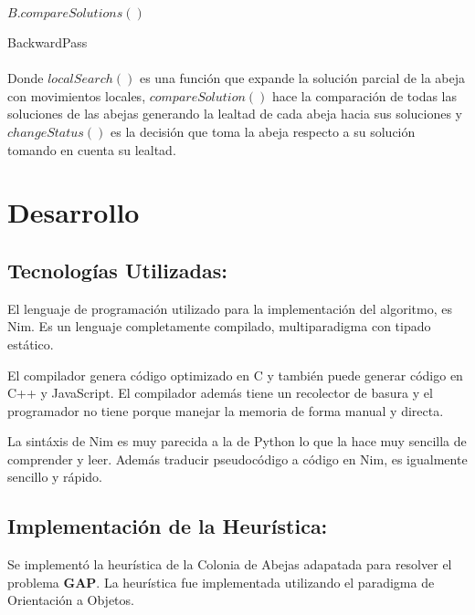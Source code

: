 \documentclass[12pt]{article}
\begin{document}
  	\begin{algorithm}[H]
  		\SetAlgoLined
  		$B.compareSolutions()$\\
  		\caption{BackwardPass}
  	\end{algorithm}
  		
  	\paragraph{}
  	Donde $localSearch()$ es una función que expande la solución parcial de la abeja
  	con movimientos locales, $compareSolution()$ hace la comparación de todas las 
  	soluciones de las abejas generando la lealtad de cada abeja hacia sus soluciones
  	y $changeStatus()$ es la decisión que toma la abeja respecto a su solución 
  	tomando en cuenta su lealtad.
  	
  	
	\section{Desarrollo}
	
	\subsection{Tecnologías Utilizadas:}
	
	El lenguaje de programación utilizado para la implementación del algoritmo, es Nim.
	Es un lenguaje completamente compilado, multiparadigma con tipado estático. 
	
	El compilador genera código optimizado en C y también puede generar código en C++ y
	JavaScript.
	El compilador además tiene un recolector de basura y el programador no tiene porque
	manejar la memoria de forma manual y directa.
	
	La sintáxis de Nim es muy parecida a la de Python lo que la hace muy sencilla de
	comprender y leer. Además traducir pseudocódigo a código en Nim, es igualmente
	sencillo y rápido.
	
	\subsection{Implementación de la Heurística:}
	
	Se implementó la heurística de la Colonia de Abejas adapatada para resolver el
	problema \textbf{GAP}. La heurística fue implementada utilizando el paradigma de
	Orientación a Objetos.
	
\end{document}
